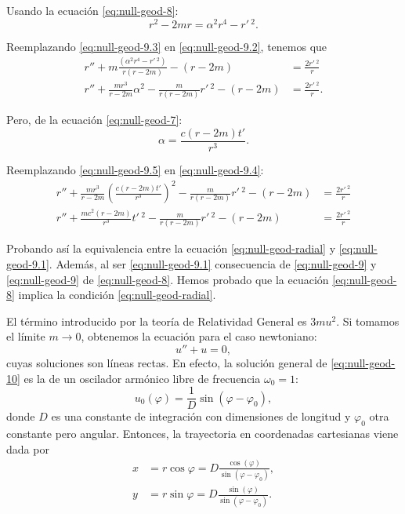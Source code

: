 \documentclass[letterpaper,11pt]{article}
\begin{document}
Usando la ecuación \eqref{eq:null-geod-8}:
\begin{equation}
r^2-2mr = \alpha^2r^4 - r'\,^2. \label{eq:null-geod-9.3}
\end{equation}

Reemplazando \eqref{eq:null-geod-9.3} en \eqref{eq:null-geod-9.2}, tenemos que
\begin{align}
r'' + m \frac{(\alpha^2r^4 - r'\,^2 )}{r(r-2m)} - (r-2m) &= \frac{2r'\,^2}{r} \\
r'' + \frac{m r^3}{r-2m}\alpha^2 - \frac{m}{r(r-2m)} r'\,^2 - (r-2m)&= \frac{2r'\,^2}{r}.\label{eq:null-geod-9.4}
\end{align}

Pero, de la ecuación \eqref{eq:null-geod-7}:
\begin{equation}
\alpha = \frac{c(r-2m)t'}{r^3}. \label{eq:null-geod-9.5}
\end{equation}

Reemplazando \eqref{eq:null-geod-9.5} en \eqref{eq:null-geod-9.4}:
\begin{align}
r'' + \frac{m r^3}{r-2m} \left(\frac{c(r-2m)t'}{r^3} \right)^2 - \frac{m}{r(r-2m)} r'\,^2 - (r-2m)&= \frac{2r'\,^2}{r} \\
r'' + \frac{mc^2(r-2m)}{r^3} t'\,^2 - \frac{m}{r(r-2m)} r'\,^2 - (r-2m) &= \frac{2r'\,^2}{r} 
\end{align}

Probando así la equivalencia entre la ecuación \eqref{eq:null-geod-radial} y \eqref{eq:null-geod-9.1}. Además, al ser \eqref{eq:null-geod-9.1} consecuencia de \eqref{eq:null-geod-9} y \eqref{eq:null-geod-9} de \eqref{eq:null-geod-8}. Hemos probado que la ecuación \eqref{eq:null-geod-8} implica la condición \eqref{eq:null-geod-radial}. 


El término introducido por la teoría de Relatividad General es $3mu^2$. Si tomamos el límite $m\to 0$, obtenemos la ecuación para el caso newtoniano:
\begin{equation} \label{eq:null-geod-10}
u'' + u = 0,
\end{equation}
cuyas soluciones son líneas rectas. En efecto, la solución general de \eqref{eq:null-geod-10} es la de un oscilador armónico libre de frecuencia $\omega_0 = 1$:
\begin{equation}
u_0(\varphi) = \frac{1}{D}\sin(\varphi - \varphi_0),
\end{equation} 
donde $D$ es una constante de integración con dimensiones de longitud y $\varphi_0$ otra constante pero angular. Entonces, la trayectoria en coordenadas cartesianas viene dada por
\begin{align}
x &= r\cos\varphi = D \frac{\cos(\varphi)}{\sin(\varphi-\varphi_0)}, \label{eq:null-geod-x}\\
y &= r\sin\varphi = D \frac{\sin(\varphi)}{\sin(\varphi-\varphi_0)}. \label{eq:null-geod-y}
\end{align}
\end{document}
